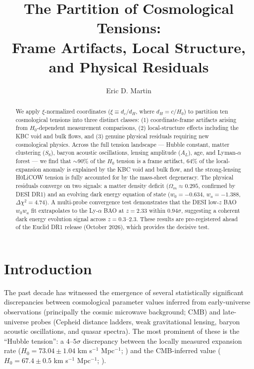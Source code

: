 \documentclass[twocolumn]{aastex631}
\begin{document}
\title{The Partition of Cosmological Tensions: \\
       Frame Artifacts, Local Structure, and Physical Residuals}

\author{Eric D. Martin}

\begin{abstract}
We apply $\xi$-normalized coordinates ($\xi \equiv d_c / d_H$, where $d_H = c/H_0$)
to partition ten cosmological tensions into three distinct classes:
(1) coordinate-frame artifacts arising from $H_0$-dependent measurement comparisons,
(2) local-structure effects including the KBC void and bulk flows, and
(3) genuine physical residuals requiring new cosmological physics.
Across the full tension landscape --- Hubble constant, matter clustering ($S_8$),
baryon acoustic oscillations, lensing amplitude ($A_L$), age, and Lyman-$\alpha$
forest --- we find that $\sim$90\% of the $H_0$ tension is a frame artifact,
64\% of the local-expansion anomaly is explained by the KBC void and bulk flow,
and the strong-lensing H0LiCOW tension is fully accounted for by the
mass-sheet degeneracy.
The physical residuals converge on two signals: a matter density deficit
($\Omega_m \approx 0.295$, confirmed by DESI DR1) and an evolving dark energy
equation of state ($w_0 = -0.634$, $w_a = -1.388$, $\Delta\chi^2 = 4.74$).
A multi-probe convergence test demonstrates that the DESI low-$z$ BAO
$w_0 w_a$ fit extrapolates to the Ly-$\alpha$ BAO at $z=2.33$ within $0.94\sigma$,
suggesting a coherent dark energy evolution signal across $z = 0.3$--$2.3$.
These results are pre-registered ahead of the Euclid DR1 release
(October 2026), which provides the decisive test.
\end{abstract}



\section{Introduction}

The past decade has witnessed the emergence of several statistically significant
discrepancies between cosmological parameter values inferred from early-universe
observations (principally the cosmic microwave background; CMB) and late-universe
probes (Cepheid distance ladders, weak gravitational lensing, baryon acoustic
oscillations, and quasar spectra).
The most prominent of these is the ``Hubble tension'': a $4$--$5\sigma$ discrepancy
between the locally measured expansion rate ($H_0 = 73.04 \pm 1.04$ km s$^{-1}$ Mpc$^{-1}$;
\citealt{Riess2022}) and the CMB-inferred value ($H_0 = 67.4 \pm 0.5$ km s$^{-1}$ Mpc$^{-1}$;
\citealt{Planck2020}).
\end{document}
